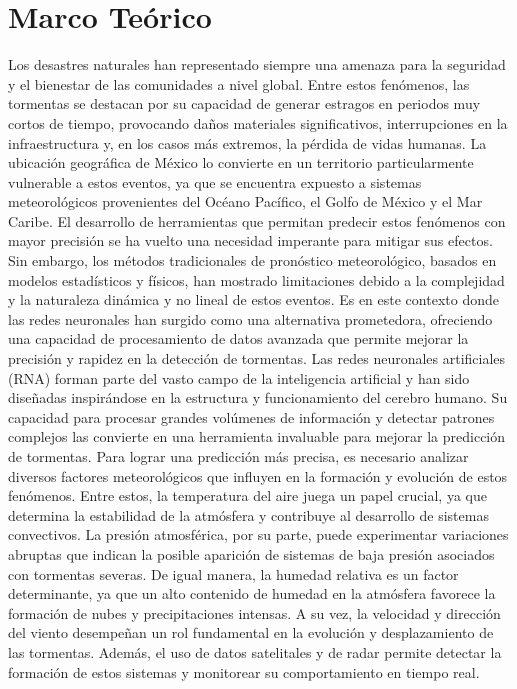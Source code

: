 \documentclass{article}
\begin{document}
\section{Marco Teórico}
Los desastres naturales han representado siempre una amenaza para la seguridad y el bienestar de las comunidades a nivel global. Entre estos fenómenos, las tormentas se destacan por su capacidad de generar estragos en periodos muy cortos de tiempo, provocando daños materiales significativos, interrupciones en la infraestructura y, en los casos más extremos, la pérdida de vidas humanas. La ubicación geográfica de México lo convierte en un territorio particularmente vulnerable a estos eventos, ya que se encuentra expuesto a sistemas meteorológicos provenientes del Océano Pacífico, el Golfo de México y el Mar Caribe.
El desarrollo de herramientas que permitan predecir estos fenómenos con mayor precisión se ha vuelto una necesidad imperante para mitigar sus efectos. Sin embargo, los métodos tradicionales de pronóstico meteorológico, basados en modelos estadísticos y físicos, han mostrado limitaciones debido a la complejidad y la naturaleza dinámica y no lineal de estos eventos. Es en este contexto donde las redes neuronales han surgido como una alternativa prometedora, ofreciendo una capacidad de procesamiento de datos avanzada que permite mejorar la precisión y rapidez en la detección de tormentas.
Las redes neuronales artificiales (RNA) forman parte del vasto campo de la inteligencia artificial y han sido diseñadas inspirándose en la estructura y funcionamiento del cerebro humano. Su capacidad para procesar grandes volúmenes de información y detectar patrones complejos las convierte en una herramienta invaluable para mejorar la predicción de tormentas.
Para lograr una predicción más precisa, es necesario analizar diversos factores meteorológicos que influyen en la formación y evolución de estos fenómenos. Entre estos, la temperatura del aire juega un papel crucial, ya que determina la estabilidad de la atmósfera y contribuye al desarrollo de sistemas convectivos. La presión atmosférica, por su parte, puede experimentar variaciones abruptas que indican la posible aparición de sistemas de baja presión asociados con tormentas severas. De igual manera, la humedad relativa es un factor determinante, ya que un alto contenido de humedad en la atmósfera favorece la formación de nubes y precipitaciones intensas. A su vez, la velocidad y dirección del viento desempeñan un rol fundamental en la evolución y desplazamiento de las tormentas. Además, el uso de datos satelitales y de radar permite detectar la formación de estos sistemas y monitorear su comportamiento en tiempo real.
\end{document}
